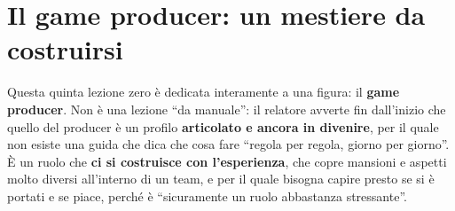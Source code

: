 %
%
%    
%    
%    
%    
%    
%

\chapter[Il game producer]{Il game producer: un mestiere da costruirsi}
\label{cap:z5-game-producer}

Questa quinta lezione zero è dedicata interamente a una figura: il
\textbf{game producer}. Non è una lezione ``da manuale'': il relatore avverte
fin dall'inizio che quello del producer è un profilo \textbf{articolato e ancora
in divenire}, per il quale non esiste una guida che dica che cosa fare ``regola
per regola, giorno per giorno''. È un ruolo che \textbf{ci si costruisce con
l'esperienza}, che copre mansioni e aspetti molto diversi all'interno di un
team, e per il quale bisogna capire presto se si è portati e se piace, perché è
``sicuramente un ruolo abbastanza stressante''.

